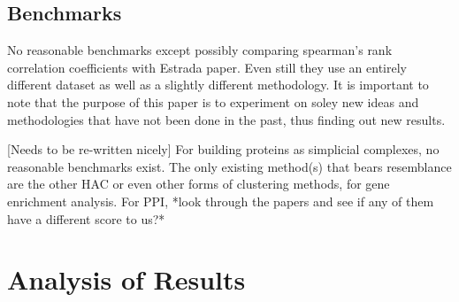 \documentclass[9pt]{article}
\begin{document}
\subsection{Benchmarks}
No reasonable benchmarks except possibly comparing spearman’s rank correlation coefficients with Estrada paper. Even still they use an entirely different dataset as well as a slightly different methodology. It is important to note that the purpose of this paper is to experiment on soley new ideas and methodologies that have not been done in the past, thus finding out new results.  

[Needs to be re-written nicely]
For building proteins as simplicial complexes, no reasonable benchmarks exist. The only existing method(s) that bears resemblance are the other HAC or even other forms of clustering methods, for gene enrichment analysis. 
For PPI, *look through the papers and see if any of them have a different score to us?*

\newpage
\section{Analysis of Results}
\end{document}
